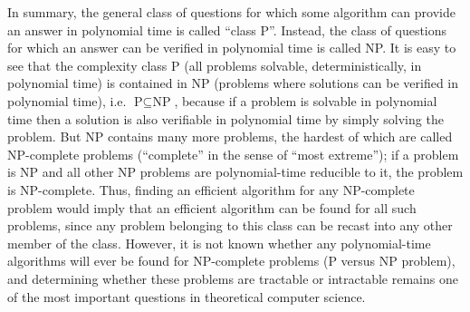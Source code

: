 In summary, the general class of questions for which some algorithm can provide an answer in polynomial time is called ``class P''. Instead, the class of questions for which an answer can be verified in polynomial time is called NP. It is easy to see that the complexity class P (all problems solvable, deterministically, in polynomial time) is contained in NP (problems where solutions can be verified in polynomial time), i.e. $\text{P}\subseteq\text{NP}$, because if a problem is solvable in polynomial time then a solution is also verifiable in polynomial time by simply solving the problem. But NP contains many more problems, the hardest of which are called NP-complete problems (``complete'' in the sense of ``most extreme''); if a problem is NP and all other NP problems are polynomial-time reducible to it, the problem is NP-complete. Thus, finding an efficient algorithm for any NP-complete problem would imply that an efficient algorithm can be found for all such problems, since any problem belonging to this class can be recast into any other member of the class. However, it is not known whether any polynomial-time algorithms will ever be found for NP-complete problems (P versus NP problem), and determining whether these problems are tractable or intractable remains one of the most important questions in theoretical computer science.

